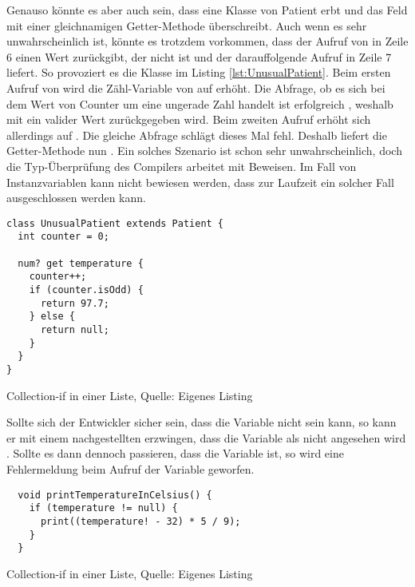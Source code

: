 Genauso könnte es aber auch sein, dass eine Klasse von Patient erbt und das Feld  mit einer gleichnamigen Getter-Methode überschreibt.
Auch wenn es sehr unwahrscheinlich ist, könnte es trotzdem vorkommen, dass der Aufruf von  in Zeile 6 einen Wert zurückgibt, der nicht  ist und der darauffolgende Aufruf in Zeile 7  liefert.
So provoziert es die Klasse  im Listing \ref{lst:UnusualPatient}.
Beim ersten Aufruf von  wird die Zähl-Variable  von  auf  erhöht.
Die Abfrage, ob es sich bei dem Wert von Counter um eine ungerade Zahl handelt ist erfolgreich , weshalb mit  ein valider Wert zurückgegeben wird.
Beim zweiten Aufruf erhöht sich  allerdings auf .
Die gleiche Abfrage schlägt dieses Mal fehl.
Deshalb liefert die Getter-Methode nun  .
Ein solches Szenario ist schon sehr unwahrscheinlich, doch die Typ-Überprüfung des Compilers arbeitet mit Beweisen.
Im Fall von Instanzvariablen kann nicht bewiesen werden, dass zur Laufzeit ein solcher Fall ausgeschlossen werden kann.

\ifincludeall
  \begin{listing}[ht]
    \begin{verbatim}
class UnusualPatient extends Patient {
  int counter = 0;

  num? get temperature {
    counter++;
    if (counter.isOdd) {
      return 97.7;
    } else {
      return null;
    }
  }
}
\end{verbatim}
    \caption[Collection-if in einer Liste]{Collection-if in einer Liste, Quelle: Eigenes Listing}
    \label{lst:UnusualPatient}
  \end{listing}
\fi


Sollte sich der Entwickler sicher sein, dass die Variable nicht  sein kann, so kann er mit einem nachgestellten \IC{!} erzwingen, dass die Variable als nicht  angesehen wird .
Sollte es dann dennoch passieren, dass die Variable  ist, so wird eine Fehlermeldung beim Aufruf der Variable geworfen.

\ifincludeall
  \begin{listing}[ht]
    \begin{verbatim}
  void printTemperatureInCelsius() {
    if (temperature != null) {
      print((temperature! - 32) * 5 / 9);
    }
  }
    \end{verbatim}
    \caption[Collection-if in einer Liste]{Collection-if in einer Liste, Quelle: Eigenes Listing}
    \label{lst:printTemperatureInCelsiusLocalVariableForceNullCheck}
  \end{listing}
\fi

